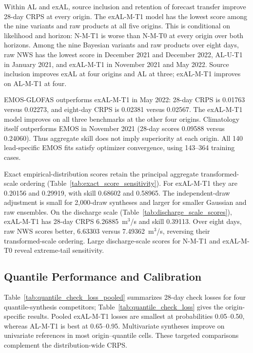 \documentclass[APA,STIX1COL]{WileyNJD-v2}
\begin{document}


Within AL and exAL, source inclusion and retention of forecast transfer improve 28-day CRPS at every origin. The exAL-M-T1 model has the lowest score among the nine variants and raw products at all five origins. This is conditional on likelihood and horizon: N-M-T1 is worse than N-M-T0 at every origin over both horizons. Among the nine Bayesian variants and raw products over eight days, raw NWS has the lowest score in December 2021 and December 2022, AL-U-T1 in January 2021, and exAL-M-T1 in November 2021 and May 2022. Source inclusion improves exAL at four origins and AL at three; exAL-M-T1 improves on AL-M-T1 at four.

EMOS-GLOFAS outperforms exAL-M-T1 in May 2022: 28-day CRPS is 0.01763 versus 0.02273, and eight-day CRPS is 0.02381 versus 0.02567. The exAL-M-T1 model improves on all three benchmarks at the other four origins. Climatology itself outperforms EMOS in November 2021 (28-day scores 0.09588 versus 0.24060). Thus aggregate skill does not imply superiority at each origin. All 140 lead-specific EMOS fits satisfy optimizer convergence, using 143--364 training cases.

Exact empirical-distribution scores retain the principal aggregate transformed-scale ordering (Table~\ref{tab:exact_score_sensitivity}). For exAL-M-T1 they are 0.20156 and 0.29919, with skill 0.68602 and 0.58965. The independent-draw adjustment is small for 2,000-draw syntheses and larger for smaller Gaussian and raw ensembles. On the discharge scale (Table~\ref{tab:discharge_scale_scores}), exAL-M-T1 has 28-day CRPS 6.26885~m$^3$/s and skill 0.39113. Over eight days, raw NWS scores better, 6.63303 versus 7.49362~m$^3$/s, reversing their transformed-scale ordering. Large discharge-scale scores for N-M-T1 and exAL-M-T0 reveal extreme-tail sensitivity.

\subsection{Quantile Performance and Calibration}
\label{subsec:quantileresults}
\label{subsec:calibrationresults}

Table~\ref{tab:quantile_check_loss_pooled} summarizes 28-day check losses for four quantile-synthesis competitors; Table~\ref{tab:quantile_check_loss} gives the origin-specific results. Pooled exAL-M-T1 losses are smallest at probabilities 0.05--0.50, whereas AL-M-T1 is best at 0.65--0.95. Multivariate syntheses improve on univariate references in most origin--quantile cells. These targeted comparisons complement the distribution-wide CRPS.
\end{document}
